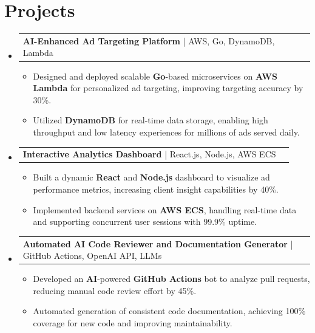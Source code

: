 \documentclass[letterpaper,11pt]{article}
\makeatletter
\newcommand{\resumeItem}[1]{
  \item\footnotesize{
    {#1 \vspace{-2pt}}
  }
}
\newcommand{\resumeProjectHeading}[2]{
    \item
    \begin{tabular*}{1.001\textwidth}{l@{\extracolsep{\fill}}r}
      \small#1 & \textbf{\small #2}\\
    \end{tabular*}\vspace{-7pt}
}
\newcommand{\resumeSubHeadingListStart}{\begin{itemize}[leftmargin=0pt, label={}]}
\newcommand{\resumeSubHeadingListEnd}{\end{itemize}}
\newcommand{\resumeItemListStart}{\begin{itemize}[leftmargin=*]}
\newcommand{\resumeItemListEnd}{\end{itemize}\vspace{-5pt}}
\makeatother
\begin{document}
\section{Projects}
    \vspace{-5pt}
    \resumeSubHeadingListStart
      \resumeProjectHeading
          {\textbf{AI-Enhanced Ad Targeting Platform} | AWS, Go, DynamoDB, Lambda}{}
          \resumeItemListStart
              \resumeItem{Designed and deployed scalable \textbf{Go}-based microservices on \textbf{AWS Lambda} for personalized ad targeting, improving targeting accuracy by 30\%.}
              \resumeItem{Utilized \textbf{DynamoDB} for real-time data storage, enabling high throughput and low latency experiences for millions of ads served daily.}
          \resumeItemListEnd
          \vspace{-12pt}
      \resumeProjectHeading
          {\textbf{Interactive Analytics Dashboard} | React.js, Node.js, AWS ECS}{}
          \resumeItemListStart
              \resumeItem{Built a dynamic \textbf{React} and \textbf{Node.js} dashboard to visualize ad performance metrics, increasing client insight capabilities by 40\%.}
              \resumeItem{Implemented backend services on \textbf{AWS ECS}, handling real-time data and supporting concurrent user sessions with 99.9\% uptime.}
          \resumeItemListEnd
          \vspace{-12pt}
      \resumeProjectHeading
          {\textbf{Automated AI Code Reviewer and Documentation Generator} | GitHub Actions, OpenAI API, LLMs}{}
          \resumeItemListStart
              \resumeItem{Developed an \textbf{AI}-powered \textbf{GitHub Actions} bot to analyze pull requests, reducing manual code review effort by 45\%.}
              \resumeItem{Automated generation of consistent code documentation, achieving 100\% coverage for new code and improving maintainability.}
          \resumeItemListEnd
    \resumeSubHeadingListEnd
\end{document}
